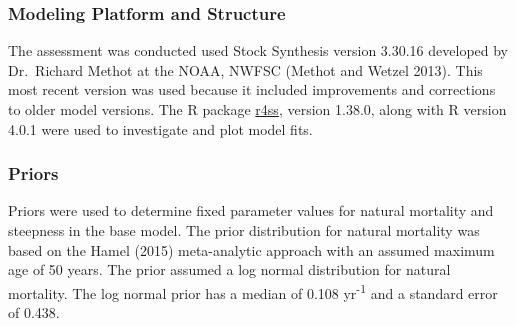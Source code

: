 \documentclass[11pt,
  english,
  a4paper,
]{article}
\begin{document}
\leavevmode\tagmcend\tagstructend\par


\hypertarget{modeling-platform-and-structure}{%
\subsubsection{Modeling Platform and Structure}\label{modeling-platform-and-structure}}

\leavevmode\tagmcend\tagstructend


The assessment was conducted used Stock Synthesis version 3.30.16 developed by Dr.~Richard Methot at the NOAA, NWFSC {(Methot and Wetzel 2013)\leavevmode\tagmcend\tagstructend}. This most recent version was used because it included improvements and corrections to older model versions. The R package {\href{https://github.com/r4ss/r4ss}{r4ss}\leavevmode\tagmcend\tagstructend}, version 1.38.0, along with R version 4.0.1 were used to investigate and plot model fits.

\leavevmode\tagmcend\tagstructend\par


\hypertarget{priors}{%
\subsubsection{Priors}\label{priors}}

\leavevmode\tagmcend\tagstructend


Priors were used to determine fixed parameter values for natural mortality and steepness in the base model. The prior distribution for natural mortality was based on the Hamel {(2015)\leavevmode\tagmcend\tagstructend} meta-analytic approach with an assumed maximum age of 50 years. The prior assumed a log normal distribution for natural mortality. The log normal prior has a median of 0.108 yr\textsuperscript{-1} and a standard error of 0.438.

\leavevmode\tagmcend\tagstructend\par

\end{document}
